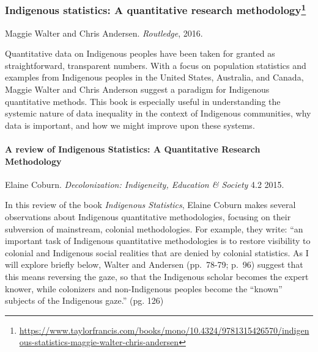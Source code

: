 \documentclass[
  11pt,
  paperpaper,
  openany]{book}
\DeclareRobustCommand{\href}[2]{#2\footnote{\url{#1}}}
\begin{document}
\hypertarget{indigenous-statistics-a-quantitative-research-methodology}{%
\subsubsection{\texorpdfstring{\href{https://www.taylorfrancis.com/books/mono/10.4324/9781315426570/indigenous-statistics-maggie-walter-chris-andersen}{Indigenous statistics: A quantitative research methodology}}{Indigenous statistics: A quantitative research methodology}}\label{indigenous-statistics-a-quantitative-research-methodology}}

Maggie Walter and Chris Andersen. \emph{Routledge}, 2016.

Quantitative data on Indigenous peoples have been taken for granted as straightforward, transparent numbers. With a focus on population statistics and examples from Indigenous peoples in the United States, Australia, and Canada, Maggie Walter and Chris Anderson suggest a paradigm for Indigenous quantitative methods. This book is especially useful in understanding the systemic nature of data inequality in the context of Indigenous communities, why data is important, and how we might improve upon these systems.

\hypertarget{a-review-of-indigenous-statistics-a-quantitative-research-methodology}{%
\paragraph*{A review of Indigenous Statistics: A Quantitative Research Methodology}\label{a-review-of-indigenous-statistics-a-quantitative-research-methodology}}

Elaine Coburn. \emph{Decolonization: Indigeneity, Education \& Society} 4.2 2015.

In this review of the book \emph{Indigenous Statistics}, Elaine Coburn makes several observations about Indigenous quantitative methodologies, focusing on their subversion of mainstream, colonial methodologies. For example, they write: ``an important task of Indigenous quantitative methodologies is to restore visibility to colonial and Indigenous social realities that are denied by colonial statistics. As I will explore briefly below, Walter and Andersen (pp.~78-79; p.~96) suggest that this means reversing the gaze, so that the Indigenous scholar becomes the expert knower, while colonizers and non-Indigenous peoples become the ``known'' subjects of the Indigenous gaze.'' (pg. 126)
\end{document}
